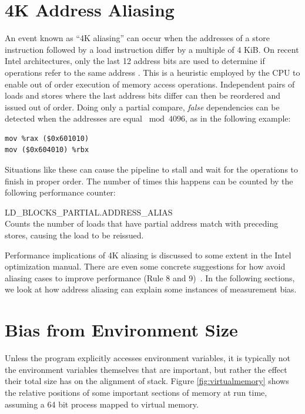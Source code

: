 \documentclass[a4paper,10pt,twocolumn,twoside]{article}
\begin{document}
\section{4K Address Aliasing}
An event known as “4K aliasing” can occur when the addresses of a store instruction followed by a load instruction differ by a multiple of 4 KiB.
On recent Intel architectures, only the last 12 address bits are used to determine if operations refer to the same address \cite{Intel:2012:OptimizationManual}.
This is a heuristic employed by the CPU to enable out of order execution of memory access operations.
Independent pairs of loads and stores where the last address bits differ can then be reordered and issued out of order.
Doing only a partial compare, \emph{false} dependencies can be detected when the addresses are equal $\bmod 4096$, as in the following example: 
\begin{lstlisting}[language={[x86masm]Assembler}]
mov %rax ($0x601010)
mov ($0x604010) %rbx
\end{lstlisting}
Situations like these can cause the pipeline to stall and wait for the operations to finish in proper order.
The number of times this happens can be counted by the following performance counter:
\begin{description}
  \item{LD\_BLOCKS\_PARTIAL.ADDRESS\_ALIAS} \hfill \\
  Counts the number of loads that have partial address match with preceding stores, causing the load to be reissued.
\end{description}
Performance implications of 4K aliasing is discussed to some extent in the Intel optimization manual. 
There are even some concrete suggestions for how avoid aliasing cases to improve performance (Rule 8 and 9)~\cite{Intel:2012:OptimizationManual}.
In the following sections, we look at how address aliasing can explain some instances of measurement bias.


\section{Bias from Environment Size}
Unless the program explicitly accesses environment variables, it is typically not the environment variables themselves that are important, but rather the effect their total size has on the alignment of stack. 
Figure \ref{fig:virtualmemory} shows the relative positions of some important sections of memory at run time, assuming a 64 bit process mapped to virtual memory. 
\end{document}
